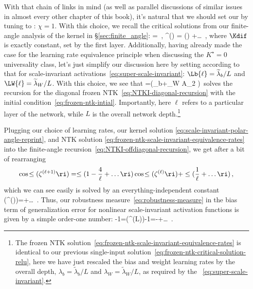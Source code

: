 With that chain of links in mind (as well as parallel discussions of similar issues in almost every other chapter of this book), it's natural that we should set our  by tuning to : $\chi=1$. With this choice, we recall the critical solutions from our finite-angle analysis of the kernel in \S\ref{sec:finite_angle}:
\be\label{eq:scale-invariant-polar-angle-reprint}
\Kdi{\ell}=\Kdif\, , \qquad \psi^{(\ell)} = \le(\ri) +\ldots\, ,
\ee
where $\Kdif$ is exactly constant, set by the first layer.
Additionally, having already made the case for the learning rate equivalence principle when discussing the $K^\star=0$ universality class, 
let's just simplify our discussion here by setting  according to that  for scale-invariant activations~\eqref{eq:super-scale-invariant}: $\Lb{\ell} = \widetilde{\lambda}_b /L$ and $\LW{\ell} = \widetilde{\lambda}_W /L$. With this choice, we see that 
\be\label{eq:frozen-ntk-scale-invariant-equivalence-rates}
\NTKIdi{\ell}=\le(\widetilde{\lambda}_b+\widetilde{\lambda}_W A_2 \Kdif\ri)\, 
\ee
solves the recursion for the diagonal frozen NTK~\eqref{eq:NTKI-diagonal-recursion} with the initial condition~\eqref{eq:frozen-ntk-intial}. Importantly, here $\ell$ refers to a particular layer of the network, while $L$ is the overall network depth.\footnote{
    The frozen NTK solution~\eqref{eq:frozen-ntk-scale-invariant-equivalence-rates} is identical to our previous single-input solution~\eqref{eq:frozen-ntk-critical-solution-relu}, here we have just rescaled the bias and weight learning rates by the overall depth, $\lambda_b = \widetilde{\lambda}_b /L$ and $\lambda_W = \widetilde{\lambda}_W /L$, as required by the ~\eqref{eq:super-scale-invariant}.
}

Plugging our choice of learning rates, our kernel solution \eqref{eq:scale-invariant-polar-angle-reprint}, and NTK solution \eqref{eq:frozen-ntk-scale-invariant-equivalence-rates} into the finite-angle recursion~\eqref{eq:NTKI-offdiagonal-recursion}, we get
after a bit of rearranging
\begin{align}
\cos\!\le(\zeta^{(\ell+1)}\ri)=\le(1-\frac{4}{\ell}+\ldots\ri) \cos\!\le(\zeta^{(\ell)}\ri)+\le(\frac{1}{\ell}+\ldots\ri)\, ,
\end{align}
which we can see easily is solved by an everything-independent constant
\be
\cos\!\le(\zeta^{(\ell)}\ri)=+\ldots\, .
\ee
Thus, our robustness measure~\eqref{eq:robustness-measure} in the bias term of generalization error for nonlinear scale-invariant activation functions is given by a simple order-one number:
\be\label{eq:weird-asymptotic-behavior}
-1=\cos\!\le(\zeta^{(L)}\ri)-1=-+\ldots\, .
\ee

